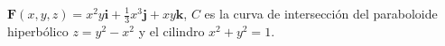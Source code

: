 \item $\mathbf{F}(x, y, z) = x^2y \mathbf{i} + \frac{1}{3}x^3 \mathbf{j} + xy \mathbf{k}$, $C$ es la curva de intersección del paraboloide hiperbólico $z = y^2 - x^2$ y el cilindro $x^2 + y^2 = 1$.
